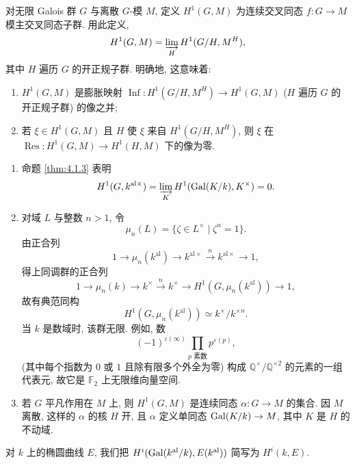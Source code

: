 对无限 Galois 群 $G$ 与离散 $G$-模 $M$, 定义 $H^1(G, M)$ 为连续交叉同态 $f\colon G\to M$ 模主交叉同态子群. 用此定义,
\[
H^1(G, M) = \varinjlim_H H^1(G/H, M^H),
\]
其中 $H$ 遍历 $G$ 的开正规子群. 明确地, 这意味着:
\begin{enumerate}[label=\textup{(\alph*)}]
\item $H^1(G, M)$ 是膨胀映射 $\operatorname{Inf}\colon H^1(G/H, M^H)\to H^1(G, M)$ ($H$ 遍历 $G$ 的开正规子群) 的像之并;
\item 若 $\xi\in H^1(G, M)$ 且 $H$ 使 $\xi$ 来自 $H^1(G/H, M^H)$, 则 $\xi$ 在 $\operatorname{Res}\colon H^1(G, M)\to H^1(H, M)$ 下的像为零.
\end{enumerate}

\begin{example} \label{thm:4.1.8} 
\begin{enumerate}[label=\textup{(\alph*)}]
\item 命题 \ref{thm:4.1.3} 表明
\[
H^1(G, k^{\mathrm{al}\times}) = \varinjlim_K H^1(\operatorname{Gal}(K/k), K^{\times}) = 0.
\]
\item 对域 $L$ 与整数 $n > 1$, 令
\[
\mu_n(L) = \{\zeta\in L^{\times} \mid \zeta^n = 1\}.
\]
由正合列
\[
1 \to \mu_n(k^{\mathrm{al}}) \to k^{\mathrm{al}\times} \xrightarrow{n} k^{\mathrm{al}\times} \to 1,
\]
得上同调群的正合列
\[
1 \to \mu_n(k) \to k^{\times} \xrightarrow{n} k^{\times} \to H^1(G, \mu_n(k^{\mathrm{al}})) \to 1,
\]
故有典范同构
\[
H^1(G, \mu_n(k^{\mathrm{al}})) \simeq k^{\times}/k^{\times n}.
\]
当 $k$ 是数域时, 该群无限. 例如, 数
\[
(-1)^{\varepsilon(\infty)}\prod_{p\text{ 素数}}p^{\varepsilon(p)},
\]
(其中每个指数为 $0$ 或 $1$ 且除有限多个外全为零) 构成 $\mathbb{Q}^{\times}/\mathbb{Q}^{\times2}$ 的元素的一组代表元, 故它是 $\mathbb{F}_2$ 上无限维向量空间.
\item 若 $G$ 平凡作用在 $M$ 上, 则 $H^1(G, M)$ 是连续同态 $\alpha\colon G\to M$ 的集合. 因 $M$ 离散, 这样的 $\alpha$ 的核 $H$ 开, 且 $\alpha$ 定义单同态 $\operatorname{Gal}(K/k)\to M$, 其中 $K$ 是 $H$ 的不动域.
\end{enumerate}
\end{example}


对 $k$ 上的椭圆曲线 $E$, 我们把 $H^i(\operatorname{Gal}(k^{\mathrm{al}}/k), E(k^{\mathrm{al}}))$ 简写为 $H^i(k, E)$.

